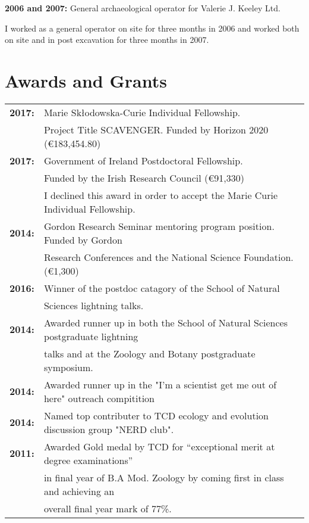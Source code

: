 \documentclass[10pt,a4paper]{article}
\begin{document}
\textbf{2006 and 2007:} General archaeological operator for Valerie J. Keeley Ltd.\\
\par{\fontsize{10.5}{10} I worked as a general operator on site for three months in 2006 and worked both on site
and in post excavation for three months in 2007.
}
\bigskip




\section{Awards and Grants}


\begin{tabular}{ll}
\textbf{2017:} & Marie Skłodowska-Curie Individual Fellowship.\\
& Project Title SCAVENGER. Funded by Horizon 2020 (\euro 183,454.80)\\
\textbf{2017:} & Government of Ireland Postdoctoral Fellowship.\\
& Funded by the Irish Research Council (\euro 91,330)\\
& I declined this award in order to accept the Marie Curie Individual Fellowship.\\
\textbf{2014:} & Gordon Research Seminar mentoring program position. Funded by Gordon\\
& Research Conferences and the National Science Foundation. (\euro 1,300)\\

\textbf{2016:} & Winner of the postdoc catagory of the School of Natural\\
& Sciences lightning talks.\\
\textbf{2014:} & Awarded runner up in both the School of Natural Sciences postgraduate lightning\\
& talks and at the Zoology and Botany postgraduate symposium.\\
\textbf{2014:} & Awarded runner up in the "I'm a scientist get me out of here" outreach compitition\\
\textbf{2014:} & Named top contributer to TCD ecology and evolution discussion group "NERD club".\\
\textbf{2011:} & Awarded Gold medal by TCD for “exceptional merit at degree examinations”\\
& in final year of B.A Mod. Zoology by coming first in class and achieving an\\
& overall final year mark of 77\%.\\
\end{tabular}
\end{document}
